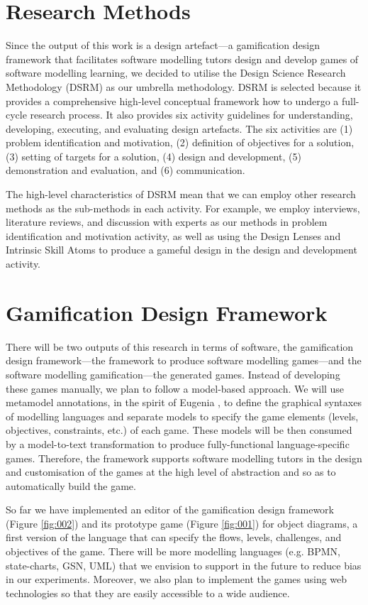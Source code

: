 \documentclass[runningheads,a4paper]{llncs}
\begin{document}
\section{Research Methods}
Since the output of this work is a design artefact---a gamification design framework that facilitates software modelling tutors design and develop games of software modelling learning, we decided to utilise the Design Science Research Methodology (DSRM) \cite{peffers2007design} as our umbrella methodology. DSRM is selected because it provides a comprehensive high-level conceptual framework how to undergo a full-cycle research process. It also provides six activity guidelines for understanding, developing, executing, and evaluating design artefacts. The six activities are (1) problem identification and motivation, (2) definition of objectives for a solution, (3) setting of targets for a solution, (4) design and development, (5) demonstration and evaluation, and (6) communication. 

The high-level characteristics of DSRM mean that we can employ other research methods as the sub-methods in each activity. For example, we employ interviews, literature reviews, and discussion with experts as our methods in problem identification and motivation activity, as well as using the Design Lenses and Intrinsic Skill Atoms \cite{deterding2015lens} to produce a gameful design in the design and development activity.

\section{Gamification Design Framework}
There will be two outputs of this research in terms of software, the gamification design framework---the framework to produce software modelling games---and the software modelling gamification---the generated games. Instead of developing these games manually, we plan to follow a model-based approach. We will use metamodel annotations, in the spirit of Eugenia \cite{kolovos2015eugenia}, to define the graphical syntaxes of modelling languages and separate models to specify the game elements (levels, objectives, constraints, etc.) of each game. These models will be then consumed by a model-to-text transformation to produce fully-functional language-specific games. Therefore, the framework supports software modelling tutors in the design and customisation of the games at the high level of abstraction and so as to automatically build the game.  

So far we have implemented an editor of the gamification design framework (Figure \ref{fig:002}) and its prototype game (Figure \ref{fig:001}) for object diagrams, a first version of the language that can specify the flows, levels, challenges, and objectives of the game. There will be more modelling languages (e.g. BPMN, state-charts, GSN, UML) that we envision to support in the future to reduce bias in our experiments. Moreover, we also plan to implement the games using web technologies so that they are easily accessible to a wide audience.
\end{document}
